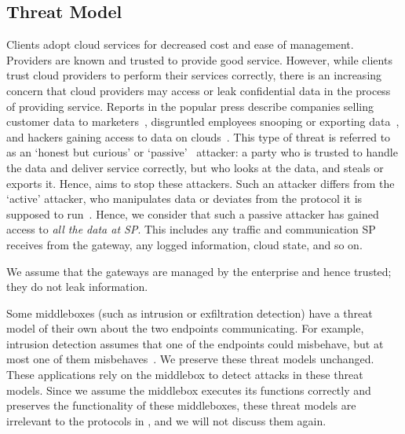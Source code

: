 \subsection{Threat Model}
  Clients adopt cloud services for decreased cost and ease of management. Providers are known and trusted to provide good service. 
  However, while clients trust cloud providers to perform their services correctly, there is an increasing concern that cloud providers may access or leak confidential data in the process of providing service.
  Reports in the popular press describe companies selling customer data to marketers~\cite{radioshack}, disgruntled employees snooping or exporting data~\cite{att}, and hackers gaining access to data on clouds~\cite{databreach,PrivacyRecords}.
  This type of threat is referred to as an `honest but curious' or `passive'~\cite{goodrich} attacker: a party who is trusted to handle the data and deliver service correctly, but who looks at the data, and steals or exports it.  Hence, \sys aims to stop these attackers.
  Such an attacker differs from the `active' attacker, who manipulates data or deviates from the protocol it is supposed to run~\cite{goodrich}.
%
Hence, we consider that such a passive attacker has gained access 
to {\em all the data at SP}.
This includes any traffic and communication SP receives from the 
gateway, any logged information, cloud state, and so on.  
 
We assume that the gateways are managed by the enterprise and hence trusted; they do not leak information.


Some middleboxes (such as intrusion or exfiltration detection) have a threat model
of their own about the two endpoints communicating. For example, intrusion detection assumes that 
one of the endpoints could misbehave, but at most one of them misbehaves~\cite{Bro}.  
We preserve these threat models unchanged. These applications rely
on the middlebox to detect attacks in these threat models. Since we assume the middlebox executes
its functions correctly and \sys preserves the functionality of these middleboxes, 
these threat models are irrelevant to the protocols in \sys, and we will not discuss them again. 


